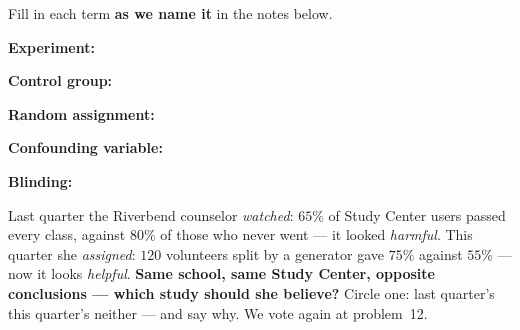 \documentclass[12pt]{article}
\newcommand{\termrowheight}{2.15cm}
\newlength{\termrowinset}\setlength{\termrowinset}{7pt}
\newcommand{\vterm}[1]{%
  \par\noindent\begin{minipage}[t][\termrowheight][t]{\linewidth}%
    \vspace*{\termrowinset}%
    \textbf{\textcolor{cerulean}{#1:}}%
  \end{minipage}\par}
\begin{document}

\vspace{0.08in}

\begin{vocabbox}
\small
Fill in each term \textbf{as we name it} in the notes below.
\vterm{Experiment}
\vterm{Control group}
\vterm{Random assignment}
\vterm{Confounding variable}
\vterm{Blinding}
\end{vocabbox}

\boxguard[12]
\begin{hookbox}
\small
Last quarter the Riverbend counselor \emph{watched}: $65\%$ of Study Center users passed
every class, against $80\%$ of those who never went --- it looked \emph{harmful}. This
quarter she \emph{assigned}: $120$ volunteers split by a generator gave $75\%$ against
$55\%$ --- now it looks \emph{helpful}. \textbf{Same school, same Study Center, opposite
conclusions --- which study should she believe?} Circle one: \; last quarter's \quad this
quarter's \quad neither \; --- and say why. We vote again at problem~12.
\par{}
\end{hookbox}
\end{document}
